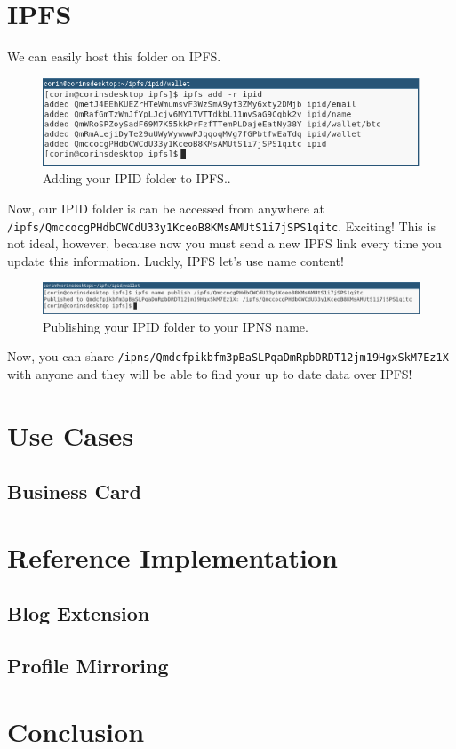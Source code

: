 \documentclass{article}
\begin{document}
\section{IPFS}

We can easily host this folder on IPFS.

\begin{figure}[h]
  \centering
  \includegraphics[width=.9\textwidth]{resources/profile_to_ipfs.png}
  \caption{Adding your IPID folder to IPFS..}
\end{figure}

Now, our IPID folder is can be accessed from anywhere at \\
  \texttt{/ipfs/QmccocgPHdbCWCdU33y1KceoB8KMsAMUtS1i7jSPS1qitc}. Exciting! 
This is not ideal, however, because now you must send a new IPFS link every time you update this information. Luckly, IPFS let's use name content! 

\begin{figure}[h]
  \hspace*{-2cm}
  \centering
  \includegraphics[width=.75\paperwidth]{resources/publish_profile.png}
  \caption{Publishing your IPID folder to your IPNS name.}
\end{figure}

Now, you can share \texttt{/ipns/Qmdcfpikbfm3pBaSLPqaDmRpbDRDT12jm19HgxSkM7Ez1X} with anyone and they will be able to find your up to date data over IPFS!



\section{Use Cases}

\subsection{Business Card}

\subsection{}

\section{Reference Implementation}

\subsection{Blog Extension}

\subsection{Profile Mirroring}

\section{Conclusion}
\end{document}
